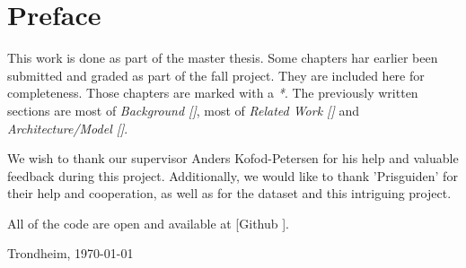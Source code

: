 \section*{Preface}



\vspace{1cm}

This work is done as part of the master thesis. Some chapters har earlier been submitted and graded
as part of the fall project. They are included here for completeness. Those chapters are marked with a \textit{*}.
The previously written sections are most of \textit{Background []}, most of
\textit{Related Work []} and \textit{Architecture/Model []}.

We wish to thank our supervisor Anders Kofod-Petersen for his help and valuable feedback during this project.
Additionally, we would like to thank 'Prisguiden' for their help and cooperation,
as well as for the dataset and this intriguing project.

All of the code are open and available at [Github \cite{githubSource}].

\vfill

\hfill \thesisAuthor

\hfill Trondheim, \today